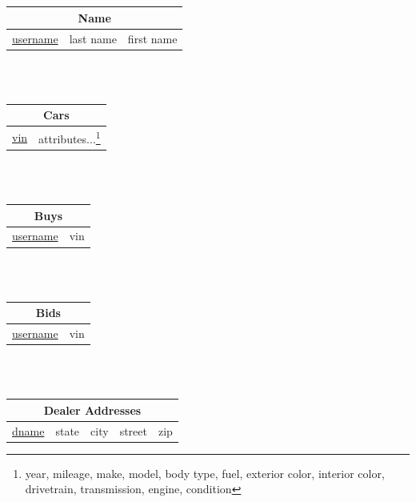 \documentclass[12pt]{article}
\begin{document}
\begin{center}
~\\~\\
\begin{tabularx}{\textwidth}{|X|X|X|}
\hline
\multicolumn{3}{|c|}{Name}\\\hline
\underline{username} & last name & first name\\\hline
\end{tabularx}
~\\~\\
\begin{tabularx}{\textwidth}{|X|X|}
\hline
\multicolumn{2}{|c|}{Cars}\\\hline
\underline{vin} & attributes...\footnote{year, mileage, make, model, body type, fuel, exterior color, interior color, drivetrain, transmission, engine, condition}\\\hline
\end{tabularx}
~\\~\\
\begin{tabularx}{\textwidth}{|X|X|}
\hline
\multicolumn{2}{|c|}{Buys}\\\hline
\underline{username} & vin\\\hline
\end{tabularx}
~\\~\\
\begin{tabularx}{\textwidth}{|X|X|}
\hline
\multicolumn{2}{|c|}{Bids}\\\hline
\underline{username} & vin\\\hline
\end{tabularx}
~\\~\\
\begin{tabularx}{\textwidth}{|X|X|X|X|X|}
\hline
\multicolumn{5}{|c|}{Dealer Addresses}\\\hline
\underline{dname} & state & city & street & zip\\\hline
\end{tabularx}
\end{center}
\end{document}
